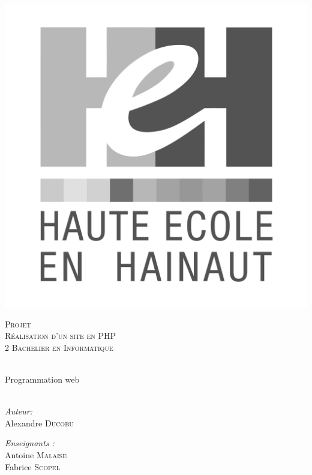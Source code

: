 \begin{center}
  \includegraphics[scale=0.12]{textures/logo/heh_bw.pdf}

  \vspace{1cm}

  \textsc{\LARGE Projet} \\ [0.5cm]
  \textsc{\Large Réalisation d'un site en PHP} \\ [0.5cm]

  \textsc{\large 2 Bachelier en Informatique} \\ [0.2cm]

  \begingroup
   \selectfont 

  \HRule \\ [0.4cm] {
    \huge Programmation web \\ [0.2cm] 
  }
  \HRule \\ [1.3cm]
  \endgroup
  \begin{minipage}[t]{0.4 \textwidth} 
    \begin{flushleft} 
      \large \emph{Auteur:} \\ 
      Alexandre \textsc{Ducobu}
    \end{flushleft} 
  \end{minipage}
  \begin{minipage}[t]{0.4 \textwidth}
    \begin{flushright} 
      \large \emph{Enseignants :} \\ 
      Antoine \textsc{Malaise} \\
      Fabrice \textsc{Scopel}
    \end{flushright} 
  \end{minipage}


\end{center}
